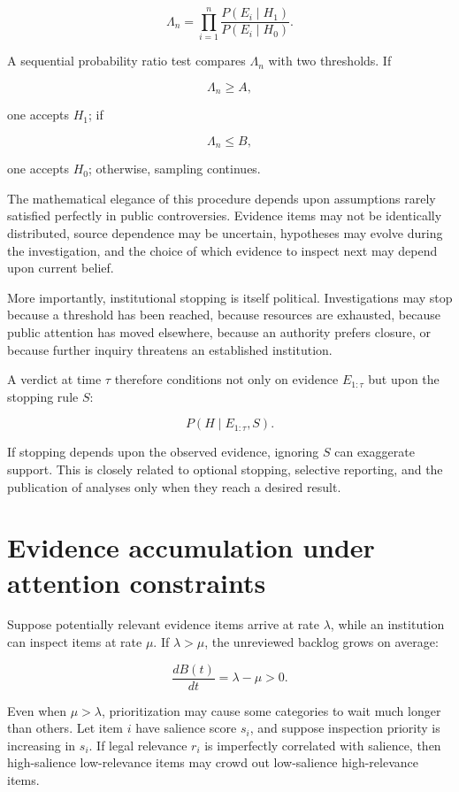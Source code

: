 \[
\Lambda_n
=
\prod_{i=1}^{n}
\frac{P(E_i\mid H_1)}
{P(E_i\mid H_0)}.
\]

A sequential probability ratio test compares \(\Lambda_n\) with two thresholds. If

\[
\Lambda_n\geq A,
\]

one accepts \(H_1\); if

\[
\Lambda_n\leq B,
\]

one accepts \(H_0\); otherwise, sampling continues.

The mathematical elegance of this procedure depends upon assumptions rarely satisfied perfectly in public controversies. Evidence items may not be identically distributed, source dependence may be uncertain, hypotheses may evolve during the investigation, and the choice of which evidence to inspect next may depend upon current belief.

More importantly, institutional stopping is itself political. Investigations may stop because a threshold has been reached, because resources are exhausted, because public attention has moved elsewhere, because an authority prefers closure, or because further inquiry threatens an established institution.

A verdict at time \(\tau\) therefore conditions not only on evidence \(E_{1:\tau}\) but upon the stopping rule \(S\):

\[
P(H\mid E_{1:\tau},S).
\]

If stopping depends upon the observed evidence, ignoring \(S\) can exaggerate support. This is closely related to optional stopping, selective reporting, and the publication of analyses only when they reach a desired result.

\section{Evidence accumulation under attention constraints}
\label{sec:a28}

Suppose potentially relevant evidence items arrive at rate \(\lambda\), while an institution can inspect items at rate \(\mu\). If \(\lambda>\mu\), the unreviewed backlog grows on average:

\[
\frac{dB(t)}{dt}
=
\lambda-\mu>0.
\]

Even when \(\mu>\lambda\), prioritization may cause some categories to wait much longer than others. Let item \(i\) have salience score \(s_i\), and suppose inspection priority is increasing in \(s_i\). If legal relevance \(r_i\) is imperfectly correlated with salience, then high-salience low-relevance items may crowd out low-salience high-relevance items.

